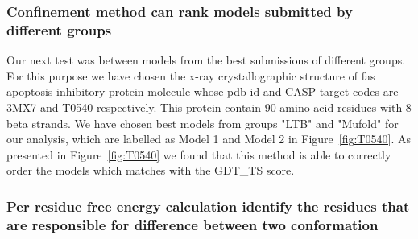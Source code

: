 \documentclass[12pt]{article}
\begin{document}
\subsubsection{Confinement method can rank models submitted by different groups}

Our next test was between models from the best submissions of different groups. 
For this purpose we have chosen the x-ray crystallographic structure of 
fas apoptosis inhibitory protein molecule whose pdb id and CASP target codes are 3MX7 and T0540 respectively.
This protein contain 90 amino acid residues with 8 beta strands. We have chosen best models from groups
"LTB" and "Mufold" for our analysis, which are labelled as Model 1 and Model 2 in Figure~\ref{fig:T0540}.
As presented in  Figure~\ref{fig:T0540} we found that this method is able to correctly order the models which matches
with the GDT\_TS score. 

\subsubsection{Per residue free energy calculation identify the residues that are responsible for difference between two conformation}
\end{document}
